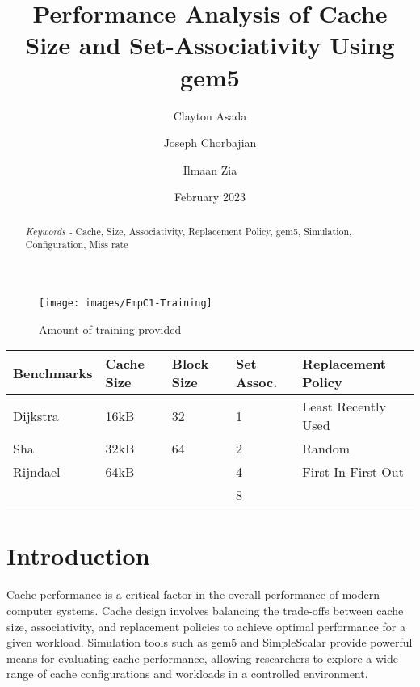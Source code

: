 \documentclass[conference]{IEEEtran}
\begin{document}
\title{Performance Analysis of Cache Size and Set-Associativity Using gem5}

\author[1]{Clayton Asada}
\author[2]{Joseph Chorbajian}
\author[3]{Ilmaan Zia}


\date{February 2023}



\maketitle



\begin{abstract}

\emph{Keywords - } Cache, Size, Associativity, Replacement Policy, gem5, Simulation, Configuration, Miss rate
\end{abstract}

\begin{figure}[H]
    \centering
    \texttt{[image: images/EmpC1-Training]}
    \caption{Amount of training provided}
    \label{fig:EmpC1-Training}
\end{figure}

\begin{table}
    \centering
    \begin{tabular}{| m{1.6cm} | m{.75cm} | m{.75cm} | m{.8cm} | m{2.6cm} |}
        \hline
        \textbf{Benchmarks} & \textbf{Cache Size} & \textbf{Block Size}& \textbf{Set Assoc.}& \textbf{Replacement Policy} \\ \hline
        Dijkstra    &   16kB  &   32    &  1   &    Least Recently Used     \\ \hline
        Sha         &   32kB  &   64    &  2   &    Random                  \\ \hline
        Rijndael    &   64kB  &         &  4   &    First In First Out      \\ \hline
                    &         &         &  8   &                            \\ \hline
    \end{tabular}
\end{table}

\section{Introduction}
Cache performance is a critical factor in the overall performance of modern computer systems. Cache design involves balancing the trade-offs between cache size, associativity, and replacement policies to achieve optimal performance for a given workload. Simulation tools such as gem5 and SimpleScalar provide powerful means for evaluating cache performance, allowing researchers to explore a wide range of cache configurations and workloads in a controlled environment.
\end{document}
